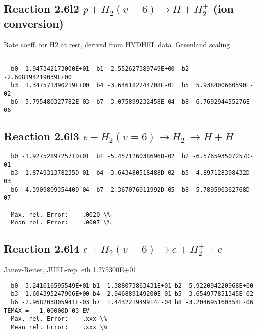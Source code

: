\documentclass[12pt,dvipdfmx]{article}
\begin{document}
\subsection{
Reaction 2.6l2
$ p + H_2(v=6) \rightarrow H + H_2^+$ (ion conversion)
}
Rate coeff. for H2 at rest, derived from HYDHEL data. Greenland scaling


\begin{small}\begin{verbatim}

  b0 -1.947342173000E+01  b1  2.552627389749E+00  b2 -2.608194219039E+00
  b3  1.347571390219E+00  b4 -3.646182244708E-01  b5  5.938400660590E-02
  b6 -5.795480327782E-03  b7  3.075899232458E-04  b8 -6.769294455276E-06

\end{verbatim}\end{small}

\newpage

\subsection{
Reaction 2.6l3
 $ e + H_2(v=6) \rightarrow H_2^- \rightarrow H + H^-$
}


\begin{small}\begin{verbatim}
  b0 -1.927528972571D+01  b1 -5.457126038696D-02  b2 -6.576593507257D-01
  b3  1.874931378235D-01  b4 -3.643480518488D-02  b5  4.897128398432D-03
  b6 -4.390980935440D-04  b7  2.367076011992D-05  b8 -5.789590362768D-07

  Max. rel. Error:    .0020 \%
  Mean rel. Error:    .0007 \%
\end{verbatim}\end{small}

\subsection{
Reaction 2.6l4
 $ e + H_2(v=6) \rightarrow e + H_2^+  + e$
}
Janev-Reiter, JUEL-rep. eth 1.275300E+01

\begin{small}\begin{verbatim}
  b0 -3.241016595549E+01 b1  1.388073863431E+01 b2 -5.922094220968E+00
  b3  1.604395247906E+00 b4 -2.946889149200E-01 b5  3.654977851345E-02
  b6 -2.968203805941E-03 b7  1.443221949914E-04 b8 -3.204695160354E-06
TEMAX =   1.00000D 03 EV
  Max. rel. Error:    .xxx \%
  Mean rel. Error:    .xxx \%
\end{verbatim}\end{small}
\end{document}
